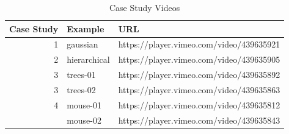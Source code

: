 \documentclass[article,notitle]{jdssv}
\begin{document}
\begin{table}

\caption{\label{tab:vimeo}Case Study Videos}
\centering
\begin{tabular}[t]{rll}
\toprule
Case Study & Example & URL\\
\midrule
1 & gaussian & https://player.vimeo.com/video/439635921\\
2 & hierarchical & https://player.vimeo.com/video/439635905\\
3 & trees-01 & https://player.vimeo.com/video/439635892\\
3 & trees-02 & https://player.vimeo.com/video/439635863\\
4 & mouse-01 & https://player.vimeo.com/video/439635812\\
\addlinespace
4 & mouse-02 & https://player.vimeo.com/video/439635843\\
\bottomrule
\end{tabular}
\end{table}

\renewcommand\refname{References}

\end{document}
